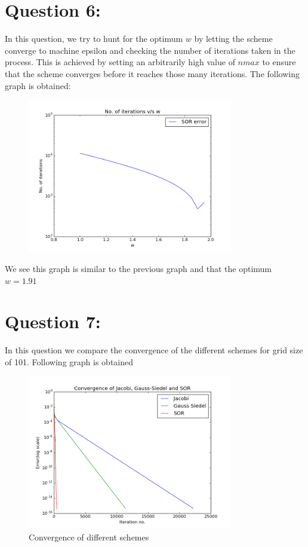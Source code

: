 \documentclass[11pt, a4paper]{article}
\begin{document}
\section{Question 6:}
\label{Question6}
In this question, we try to hunt for the optimum $w$ by letting the scheme converge to machine epsilon and checking the number
of iterations taken in the process. 
This is achieved by setting an arbitrarily high value of $nmax$ to ensure that the scheme converges before it reaches those
many iterations. The following graph is obtained:
\begin{figure}[H]
\centering
\includegraphics[width = 0.8\textwidth]{niter_w.png}
\end{figure}

We see this graph is similar to the previous graph and that the optimum $w = 1.91$

\section{Question 7:}
In this question we compare the convergence of the different schemes for grid size of 101. Following graph is obtained
\begin{figure}[H]
 \centering
 \includegraphics[width = 0.8\textwidth]{Comparison.png}
 \caption{Convergence of different schemes}
\end{figure}
\end{document}
